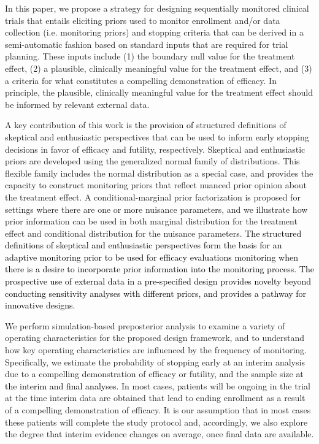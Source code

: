 \documentclass[12pt]{article}
\begin{document}
In this paper, we propose a strategy for designing sequentially monitored clinical trials that entails eliciting 
priors used to monitor enrollment and/or data collection (i.e. monitoring priors) and stopping criteria that can 
be derived in a semi-automatic fashion based on standard inputs that are required for trial planning. 
%
These inputs include (1) the boundary null value for the treatment effect, (2) a plausible, clinically meaningful 
value for the treatment effect, and (3) a criteria for what constitutes a compelling demonstration of efficacy. 
%
In principle, the plausible, clinically meaningful value for the treatment effect should be informed by relevant external data. 


A key contribution of this work is \textcolor{black}{the provision of} structured definitions of skeptical and enthusiastic perspectives that can be used 
to inform early stopping decisions in favor of efficacy and futility, respectively. Skeptical and enthusiastic priors are developed using the generalized normal family of distributions. 
This flexible family includes the normal distribution as a special case, and provides the capacity to construct monitoring 
priors that reflect nuanced prior opinion about the treatment effect. 
A conditional-marginal prior factorization is proposed for settings where there are one or more nuisance 
parameters, and we illustrate how prior information can be used in both marginal 
distribution for the treatment effect and conditional distribution for the nuisance parameters. 
%
\textcolor{black}{The structured definitions of skeptical and enthusiastic perspectives form the basis for an adaptive monitoring prior to be used for efficacy evaluations monitoring when there is a desire to incorporate prior information into the monitoring process. The prospective use of external data in a pre-specified design provides novelty beyond conducting sensitivity analyses with different priors, and provides a pathway for innovative designs.}

We perform simulation-based preposterior analysis to examine a variety of operating characteristics for the proposed design framework,
and to understand how key operating characteristics are influenced by the frequency of monitoring.
Specifically, we estimate the probability of stopping early at an interim analysis due to a compelling demonstration of efficacy or futility, \textcolor{black}{and} the sample size \textcolor{black}{at the interim and final analyses.}
In most cases, patients will be ongoing in the trial at the time interim data are obtained that lead to 
ending enrollment as a result of a compelling demonstration of efficacy. 
It is our assumption that in most cases these patients will complete the study protocol and, accordingly, we also explore 
the degree that interim evidence changes on average, once final data are available.	
\end{document}
